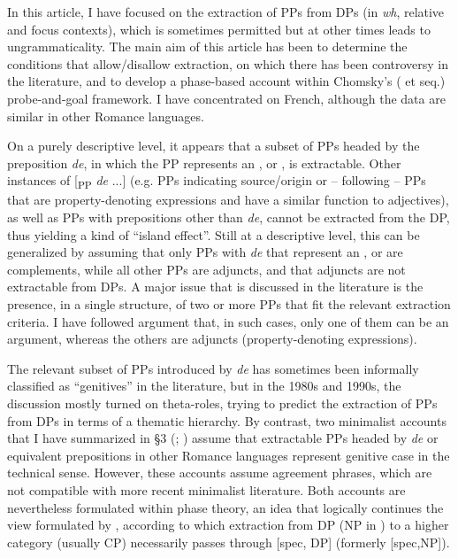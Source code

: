 \documentclass[output=paper]{langsci/langscibook}
\begin{document}
In this article, I have focused on the extraction of PPs from DPs (in \textit{wh}, relative and focus contexts), which is sometimes permitted but at other times leads to ungrammaticality. The main aim of this article has been to determine the conditions that allow/disallow extraction, on which there has been controversy in the literature, and to develop a phase-based account within Chomsky’s (\citeyear{Chomsky2000} et seq.) probe-and-goal framework. I have concentrated on French, although the data are similar in other Romance languages.

On a purely descriptive level, it appears that a subset of PPs headed by the preposition \textit{de}, in which the PP represents an \AGENT, \THEME or \POSSESSOR, is extractable. Other instances of [\textsubscript{PP} \textit{de} ...] (e.g. PPs indicating source/origin or – following \citealt{Kolliakou1999} – PPs that are property-denoting expressions and have a similar function to adjectives), as well as PPs with prepositions other than \textit{de}, cannot be extracted from the DP, thus yielding a kind of “island effect”. Still at a descriptive level, this can be generalized by assuming that only PPs with \textit{de} that represent an \AGENT, \THEME or \POSSESSOR are complements, while all other PPs are adjuncts, and that adjuncts are not extractable from DPs. A major issue that is discussed in the literature is the presence, in a single structure, of two or more PPs that fit the relevant extraction criteria. I have followed  argument that, in such cases, only one of them can be an argument, whereas the others are adjuncts (property-denoting expressions).

The relevant subset of PPs introduced by \textit{de} has sometimes been informally classified as “genitives” in the literature, but in the 1980s and 1990s, the discussion mostly turned on theta-roles, trying to predict the extraction of PPs from DPs in terms of a thematic hierarchy. By contrast, two minimalist accounts that I have summarized in §3 (\citealt{Gutiérrez-Bravo2001}; \citealt{Cinque2014}) assume that extractable PPs headed by \textit{de} or equivalent prepositions in other Romance languages represent genitive case in the technical sense. However, these accounts assume agreement phrases, which are not compatible with more recent minimalist literature. Both accounts are nevertheless formulated within phase theory, an idea that logically continues the view formulated by \citet{Cinque1980}, according to which extraction from DP (NP in \citealt{Cinque1980}) to a higher category (usually CP) necessarily passes through [spec, DP] (formerly [spec,NP]). 
\end{document}
